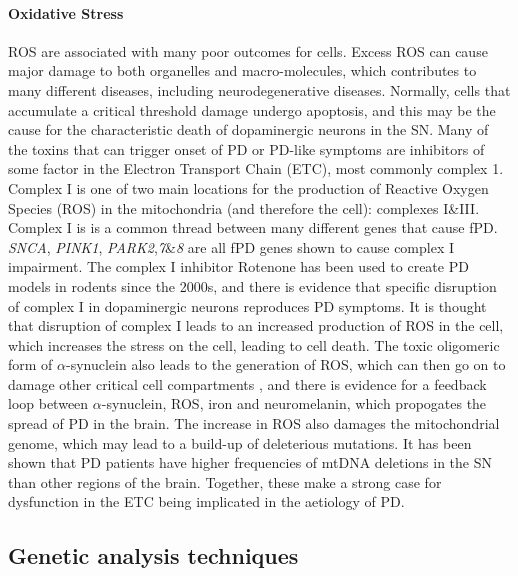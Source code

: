 \documentclass{article}
\begin{document}
\paragraph{Oxidative Stress}
ROS are associated with many poor outcomes for cells. Excess ROS can cause major damage to both organelles and macro-molecules, which contributes to many different diseases, including neurodegenerative diseases\cite{Brieger2012ReactiveDisease}. Normally, cells that accumulate a critical threshold damage undergo apoptosis, and this may be the cause for the characteristic death of dopaminergic neurons in the SN\cite{Subramaniam2013MitochondrialDisease}. Many of the toxins that can trigger onset of PD or PD-like symptoms are inhibitors of some factor in the Electron Transport Chain (ETC), most commonly complex 1\cite{Subramaniam2013MitochondrialDisease}.
Complex I is one of two main locations for the production of Reactive Oxygen Species (ROS) in the mitochondria (and therefore the cell): complexes I\&III\cite{Murphy2009HowSpecies}. Complex I is is a common thread between many different genes that cause fPD. \textit{SNCA}, \textit{PINK1}, \textit{PARK2},\textit{7}\&\textit{8} are all fPD genes shown to cause complex I impairment\cite{Subramaniam2013MitochondrialDisease}. The complex I inhibitor Rotenone has been used to create PD models in rodents since the 2000s\cite{Betarbet2000ChronicDisease}, and there is evidence that specific disruption of complex I in dopaminergic neurons reproduces PD symptoms\cite{Gonzalez-Rodriguez2021DisruptionParkinsonism}. It is thought that disruption of complex I leads to an increased production of ROS in the cell, which increases the stress on the cell, leading to cell death\cite{Subramaniam2013MitochondrialDisease}.
The toxic oligomeric form of $\alpha$-synuclein also leads to the generation of ROS, which can then go on to damage other critical cell compartments \cite{Choi2022PathologicalToxicity}, and there is evidence for a feedback loop between $\alpha$-synuclein, ROS, iron and neuromelanin, which propogates the spread of PD in the brain\cite{JansenvanRensburg2021ToxicTurmeric}.
The increase in ROS also damages the mitochondrial genome, which may lead to a build-up of deleterious mutations. It has been shown that PD patients have higher frequencies of mtDNA deletions in the SN than other regions of the brain\cite{Bender2006HighDisease}.
Together, these make a strong case for dysfunction in the ETC being implicated in the aetiology of PD.
\subsection{Genetic analysis techniques}
\end{document}

